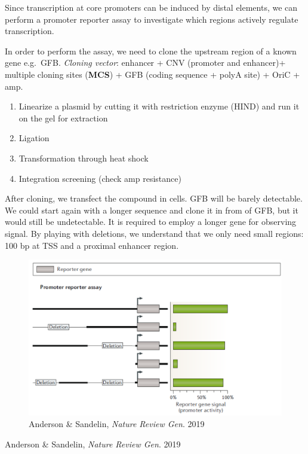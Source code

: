 Since transcription at core promoters can be induced by distal elements, we can perform a promoter reporter assay to investigate which regions actively regulate transcription.

In order to perform the assay, we need to clone the upstream region of a known gene e.g.~GFB. \emph{Cloning vector}: enhancer + CNV (promoter and enhancer)+ multiple cloning sites (\textbf{MCS}) + GFB (coding sequence + polyA site) + OriC + amp.

\begin{enumerate}
\def\labelenumi{\arabic{enumi}.}
\tightlist
\item
  Linearize a plasmid by cutting it with restriction enzyme (HIND) and run it on the gel for extraction
\item
  Ligation
\item
  Transformation through heat shock
\item
  Integration screening (check amp resistance)
\end{enumerate}

After cloning, we transfect the compound in cells. GFB will be barely detectable. We could start again with a longer sequence and clone it in from of GFB, but it would still be undetectable. It is required to employ a longer gene for observing signal. By playing with deletions, we understand that we only need small regions: 100 bp at TSS and a proximal enhancer region.

\begin{figure}
\centering
\includegraphics[width=\textwidth]{../_resources/Screenshot_2022-10-10_at_10-45-54.png}
\caption{Anderson \& Sandelin, \emph{Nature Review Gen}. 2019}
\end{figure}

Anderson \& Sandelin, \emph{Nature Review Gen}. 2019

